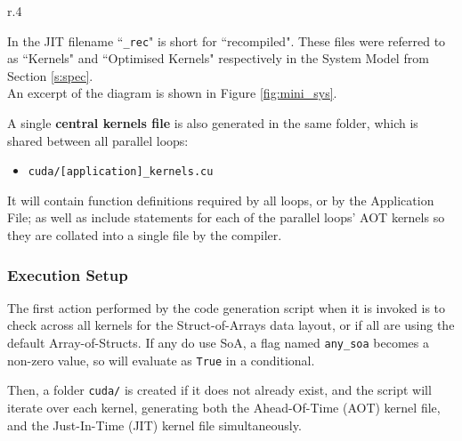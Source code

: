 \begin{wrapfigure}[5]{r}{.4\textwidth}
  \vspace{-1cm}
  \caption{\label{fig:mini_sys}Subsection of System Diagram}
\end{wrapfigure}
\noindent In the JIT filename ``\verb|_rec|" is short for ``recompiled". These files were referred to as ``Kernels" and ``Optimised Kernels" respectively in the System Model from Section \ref{s:spec}.\\
An excerpt of the diagram is shown in Figure \ref{fig:mini_sys}.

\clearpage
A single \textbf{central kernels file} is also generated in the same folder, which is shared between all parallel loops:
\begin{itemize}
\vspace{-.5em}
\item{\verb|cuda/[application]_kernels.cu|}
\end{itemize}
It will contain function definitions required by all loops, or by the Application File; as well as include statements for each of the parallel loops' AOT kernels so they are collated into a single file by the compiler.

\subsubsection{Execution Setup}
The first action performed by the code generation script when it is invoked is to check across all kernels for the Struct-of-Arrays data layout, or if all are using the default Array-of-Structs. If any do use SoA, a flag named \verb|any_soa| becomes a non-zero value, so will evaluate as \verb|True| in a conditional.
\par Then, a folder \verb|cuda/| is created if it does not already exist, and the script will iterate over each kernel, generating both the Ahead-Of-Time (AOT) kernel file, and the Just-In-Time (JIT) kernel file simultaneously.

